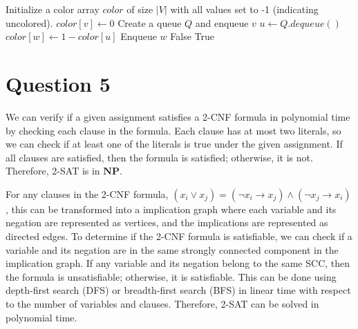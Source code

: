 \documentclass[a4paper, UTF-8]{article}
\theoremstyle{plain}
\begin{document}
\begin{algorithm}[H]
  \caption{2-Coloring Algorithm}
  \begin{algorithmic}[1]
      \State Initialize a color array $color$ of size $|V|$ with all values set to -1 (indicating uncolored).
         
          \State $color[v] \gets 0$ 
          \State Create a queue $Q$ and enqueue $v$
            \State $u \gets Q.dequeue()$
               
                \State $color[w] \gets 1 - color[u]$ 
                \State Enqueue $w$
               
                \State \Return False 
              \EndIf
            \EndFor
          \EndWhile
        \EndIf
      \EndFor
      \State \Return True 
    \EndProcedure
  \end{algorithmic}
\end{algorithm}

\section{Question 5}

We can verify if a given assignment satisfies a 2-CNF formula in polynomial time by checking each clause in the formula. Each clause has at most two literals, so we can check if at least one of the literals is true under the given assignment. If all clauses are satisfied, then the formula is satisfied; otherwise, it is not. Therefore, 2-SAT is in $\textbf{NP}$.

For any clauses in the 2-CNF formula, $(x_i \lor x_j) = (\lnot x_i \rightarrow x_j) \land (\lnot x_j \rightarrow x_i)$, this can be transformed into a implication graph where each variable and its negation are represented as vertices, and the implications are represented as directed edges. To determine if the 2-CNF formula is satisfiable, we can check if a variable and its negation are in the same strongly connected component in the implication graph. If any variable and its negation belong to the same SCC, then the formula is unsatisfiable; otherwise, it is satisfiable. This can be done using depth-first search (DFS) or breadth-first search (BFS) in linear time with respect to the number of variables and clauses. Therefore, 2-SAT can be solved in polynomial time.
\end{document}
